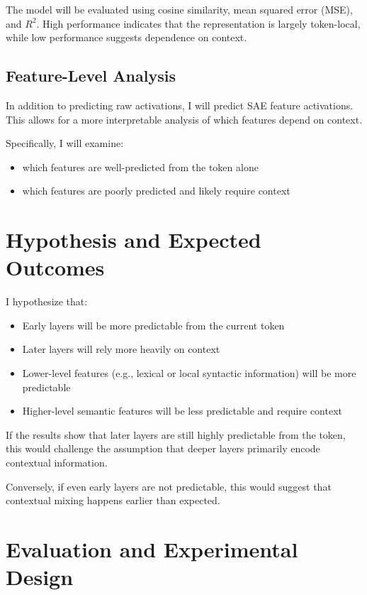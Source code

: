 \documentclass[12pt]{article}
\begin{document}
The model will be evaluated using cosine similarity, mean squared error (MSE), and $R^2$. High performance indicates that the representation is largely token-local, while low performance suggests dependence on context.

\subsection*{Feature-Level Analysis}

In addition to predicting raw activations, I will predict SAE feature activations. This allows for a more interpretable analysis of which features depend on context.

Specifically, I will examine:
\begin{itemize}
    \item which features are well-predicted from the token alone
    \item which features are poorly predicted and likely require context
\end{itemize}

\section{Hypothesis and Expected Outcomes}

I hypothesize that:
\begin{itemize}
    \item Early layers will be more predictable from the current token
    \item Later layers will rely more heavily on context
    \item Lower-level features (e.g., lexical or local syntactic information) will be more predictable
    \item Higher-level semantic features will be less predictable and require context
\end{itemize}

If the results show that later layers are still highly predictable from the token, this would challenge the assumption that deeper layers primarily encode contextual information.

Conversely, if even early layers are not predictable, this would suggest that contextual mixing happens earlier than expected.

\section{Evaluation and Experimental Design}
\end{document}
